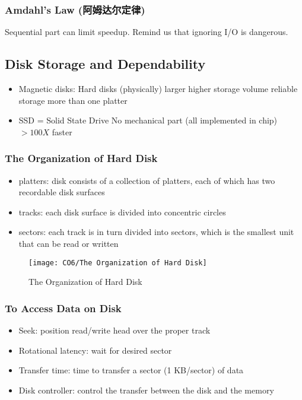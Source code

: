 \subsubsection{Amdahl's Law (阿姆达尔定律)}
Sequential part can limit speedup. Remind us that ignoring I/O is dangerous. 

\subsection{Disk Storage and Dependability}
\begin{itemize}\small
    \item  Magnetic disks: Hard disks
    \subitem (physically) larger
    \subitem higher storage volume
    \subitem reliable storage
    \subitem more than one platter
    \item SSD = Solid State Drive
    \subitem No mechanical part (all implemented in chip)
    \subitem $> 100X$ faster
\end{itemize}

\subsubsection{The Organization of Hard Disk}
\begin{itemize}\small
    \item platters: disk consists of a collection of platters, each of which has two recordable disk surfaces
    \item tracks: each disk surface is divided into concentric circles
    \item sectors: each track is in turn divided into sectors, which is the smallest unit that can be read or written
\end{itemize}

\begin{figure}[!htb]
    \centering
    \texttt{[image: CO6/The Organization of Hard Disk]}
    \caption{The Organization of Hard Disk}
\end{figure}

\subsubsection{To Access Data on Disk}
\begin{itemize}\small
    \item Seek: position read/write head over the proper track
    \item Rotational latency: wait for desired sector
    \item Transfer time: time to transfer a sector (1 KB/sector) of data
    \item Disk controller: control the transfer between the disk and the memory
\end{itemize}

